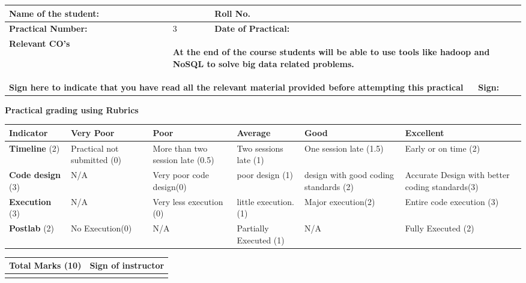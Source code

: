 \documentclass[11pt,article]{memoir}
\begin{document}
\sloppy
\fancypage{\doublebox}{}
\begin{flushleft}


    \begin{tabular}{ | p{4cm} | p{5cm} | p{3.5cm} | p{2cm} |}
    \hline

    \textbf{Name of the student:}& &\textbf{Roll No.} & \\ \hline
    \textbf{Practical Number:}& 3 & \textbf{Date of Practical:} & \\ \hline
	\textbf{Relevant CO's} & \multicolumn{3}{|p{10.5cm}|}{\begin{flushleft}
	\textbf{At the end of the course students will be able to use tools like hadoop and NoSQL to solve big data related problems.}
	\end{flushleft}}\\
    \hline
    \multicolumn{3}{|p{12.5cm}|}{\textbf{Sign here to indicate that you have read all the relevant material provided before attempting this practical}}& \textbf{Sign:}\\ \hline
    \end{tabular}
    \vspace{1cm}
        \textbf{Practical grading using Rubrics}
           \begin{tabular}{|p{2cm}|p{2cm}|p{2cm}|p{2cm}|p{2cm}|p{2cm}|}
           \hline \textbf{Indicator} & \textbf{Very Poor} & \textbf{Poor} & \textbf{Average} & \textbf{Good} & \textbf{Excellent} \\ 
           \hline \textbf{Timeline} (2) & Practical not submitted (0) & More than two session late (0.5) & Two sessions late (1) & One session late (1.5) & Early or on time (2) \\ 
           \hline \textbf{Code design} (3) & N/A & Very poor code design(0) & poor design (1) & design with good coding standards (2) & Accurate Design with better coding standards(3) \\ 
           \hline \textbf{Execution} (3) & N/A & Very less execution (0)
            & little execution.(1) & Major execution(2)
            & Entire code execution (3) \\ 
           \hline \textbf{Postlab} (2) & No Execution(0) & N/A& Partially Executed (1) & N/A & Fully Executed (2) \\ 
           \hline 
           \end{tabular}
        \vspace{-8cm}
        \begin{table}[h!]
        \centering
        \begin{tabular}{|c|c|}
                \hline \textbf{Total Marks (10)} & \textbf{Sign of instructor} \\ 
                \hline  &  \\ 
                \hline 
                \end{tabular} 
        \end{table}
        

\end{flushleft}
\end{document}
